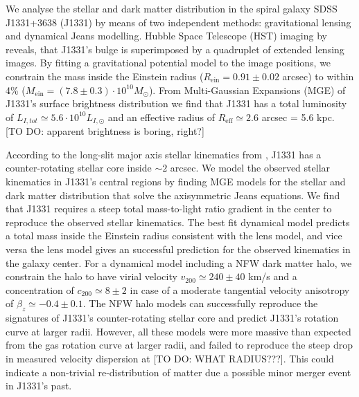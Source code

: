 We analyse the stellar and dark matter distribution in the spiral galaxy SDSS J1331+3638 (J1331) by means of two independent methods: gravitational lensing and dynamical Jeans modelling. Hubble Space Telescope (HST) imaging by \citet{SWELLSI} reveals, that J1331's bulge is superimposed by a quadruplet of extended lensing images. By fitting a gravitational potential model to the image positions, we constrain the mass inside the Einstein radius ($R_\text{ein}=0.91\pm0.02$ arcsec) to within 4\% ($M_\text{ein} = (7.8\pm0.3) \cdot 10^{10} M_\odot$). From Multi-Gaussian Expansions (MGE) of J1331's surface brightness distribution we find that J1331 has a total luminosity of $L_{I,tot} \simeq 5.6 \cdot 10^{10}L_{I,\odot}$ and an effective radius of $R_\text{eff} \simeq 2.6$ arcsec = 5.6 kpc. [TO DO: apparent brightness is boring, right?]

According to the long-slit major axis stellar kinematics from \citet{SWELLSV}, J1331 has a counter-rotating stellar core inside $\sim 2$ arcsec. We model the observed stellar kinematics in J1331's central regions by finding MGE models for the stellar and dark matter distribution that solve the axisymmetric Jeans equations. We find that J1331 requires a steep total mass-to-light ratio gradient in the center to reproduce the observed stellar kinematics. The best fit dynamical model predicts a total mass inside the Einstein radius consistent with the lens model, and vice versa the lens model gives an successful prediction for the observed kinematics in the galaxy center. For a dynamical model including a NFW dark matter halo,  we constrain the halo to have virial velocity $v_{200} \simeq 240 \pm 40$ km/s and a concentration of $c_{200} \simeq 8 \pm 2$ in case of a moderate tangential velocity anisotropy of $\beta_z \simeq −0.4 \pm 0.1$. The NFW halo models can successfully reproduce the signatures of J1331's counter-rotating stellar core and predict J1331's rotation curve at larger radii. However, all these models were more massive than expected from the gas rotation curve at larger radii, and failed to reproduce the steep drop in measured velocity dispersion at [TO DO: WHAT RADIUS???]. This could indicate a non-trivial re-distribution of matter due a possible minor merger event in J1331's past.